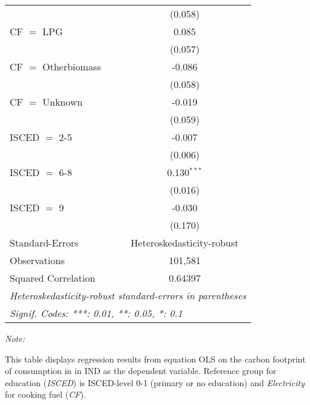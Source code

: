 \begin{table}[htbp!]
\begin{adjustbox}{width = 1\textwidth, max height = 0.95\textheight, center}
\begin{threeparttable}[b]
\begin{tabular}{lc}
                                & (0.058)\\   
            CF $=$ LPG          & 0.085\\   
                                & (0.057)\\   
            CF $=$ Otherbiomass & -0.086\\   
                                & (0.058)\\   
            CF $=$ Unknown      & -0.019\\   
                                & (0.059)\\   
            ISCED $=$ 2-5       & -0.007\\   
                                & (0.006)\\   
            ISCED $=$ 6-8       & 0.130$^{***}$\\   
                                & (0.016)\\   
            ISCED $=$ 9         & -0.030\\   
                                & (0.170)\\   
            \midrule 
            Standard-Errors     & Heteroskedasticity-robust \\   
            Observations        & 101,581\\  
            Squared Correlation & 0.64397\\  
            \midrule \midrule
            \multicolumn{2}{l}{\emph{Heteroskedasticity-robust standard-errors in parentheses}}\\
            \multicolumn{2}{l}{\emph{Signif. Codes: ***: 0.01, **: 0.05, *: 0.1}}\\
         \end{tabular}
         
         \begin{tablenotes}\item \medskip \textit{Note:}
            \item This table displays regression results from equation OLS on the carbon footprint of consumption in  in IND as the dependent variable.  Reference group for education (\textit{ISCED}) is ISCED-level 0-1 (primary or no education) and \textit{Electricity} for cooking fuel (\textit{CF}).
         \end{tablenotes}
      \end{threeparttable}
   \end{adjustbox}
\end{table}


